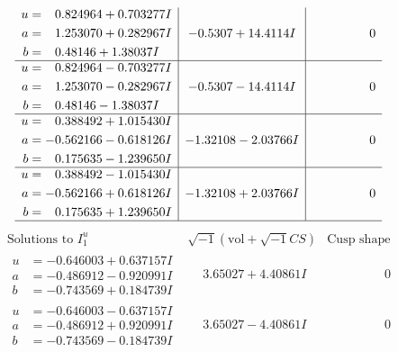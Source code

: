 \documentclass[1p]{elsarticle_modified}
\theoremstyle{definition}
\newcommand{\I}{\sqrt{-1}}
\begin{document}
$$\begin{array}{c|c|c}
\begin{aligned}
u &= \phantom{-}0.824964 + 0.703277 I \\
a &= \phantom{-}1.253070 + 0.282967 I \\
b &= \phantom{-}0.48146 + 1.38037 I\end{aligned}
 & -0.5307 + 14.4114 I & \phantom{-0.000000 } 0 \\ \hline\begin{aligned}
u &= \phantom{-}0.824964 - 0.703277 I \\
a &= \phantom{-}1.253070 - 0.282967 I \\
b &= \phantom{-}0.48146 - 1.38037 I\end{aligned}
 & -0.5307 - 14.4114 I & \phantom{-0.000000 } 0 \\ \hline\begin{aligned}
u &= \phantom{-}0.388492 + 1.015430 I \\
a &= -0.562166 - 0.618126 I \\
b &= \phantom{-}0.175635 - 1.239650 I\end{aligned}
 & -1.32108 - 2.03766 I & \phantom{-0.000000 } 0 \\ \hline\begin{aligned}
u &= \phantom{-}0.388492 - 1.015430 I \\
a &= -0.562166 + 0.618126 I \\
b &= \phantom{-}0.175635 + 1.239650 I\end{aligned}
 & -1.32108 + 2.03766 I & \phantom{-0.000000 } 0\\
 \hline 
 \end{array}$$\newpage$$\begin{array}{c|c|c}  
\text{Solutions to }I^u_{1}& \I (\text{vol} + \sqrt{-1}CS) & \text{Cusp shape}\\
 \hline 
\begin{aligned}
u &= -0.646003 + 0.637157 I \\
a &= -0.486912 - 0.920991 I \\
b &= -0.743569 + 0.184739 I\end{aligned}
 & \phantom{-}3.65027 + 4.40861 I & \phantom{-0.000000 } 0 \\ \hline\begin{aligned}
u &= -0.646003 - 0.637157 I \\
a &= -0.486912 + 0.920991 I \\
b &= -0.743569 - 0.184739 I\end{aligned}
 & \phantom{-}3.65027 - 4.40861 I & \phantom{-0.000000 } 0 \\ \hline\begin{aligned}

\end{aligned}
\end{array}$$
\end{document}
